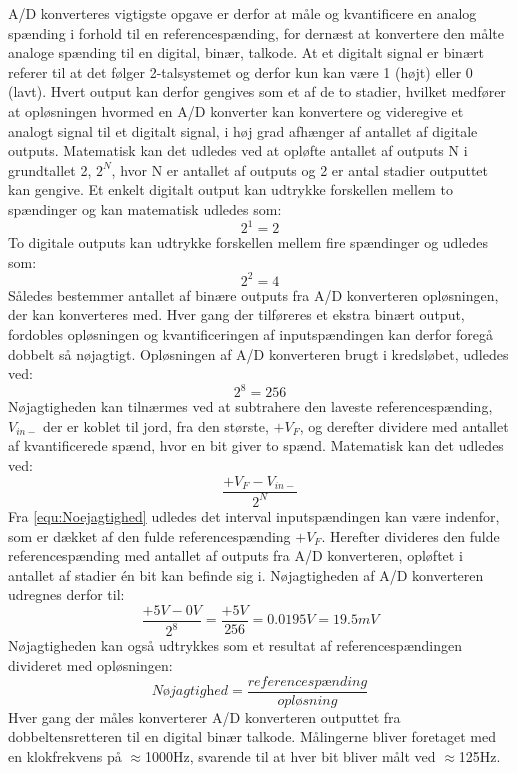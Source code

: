 A/D konverteres vigtigste opgave er derfor at måle og kvantificere en analog spænding i forhold til en referencespænding, for dernæst at konvertere den målte analoge spænding til en digital, binær, talkode. At et digitalt signal er binært referer til at det følger 2-talsystemet og derfor kun kan være 1 (højt) eller 0 (lavt). Hvert output kan derfor gengives som et af de to stadier, hvilket medfører at opløsningen hvormed en A/D konverter kan konvertere og videregive et analogt signal til et digitalt signal, i høj grad afhænger af antallet af digitale outputs. 
Matematisk kan det udledes ved at opløfte antallet af outputs N i grundtallet 2, $2^N$, hvor N er antallet af outputs og 2 er antal stadier outputtet kan gengive. Et enkelt digitalt output kan udtrykke forskellen mellem to spændinger og kan matematisk udledes som:
%
\begin{equation}
	2^1 = 2
\end{equation}
%
To digitale outputs kan udtrykke forskellen mellem fire spændinger og udledes som:
%
\begin{equation}
	2^2 = 4
\end{equation}  
%
Således bestemmer antallet af binære outputs fra A/D konverteren opløsningen, der kan konverteres med. Hver gang der tilføreres et ekstra binært output, fordobles opløsningen og kvantificeringen af inputspændingen kan derfor foregå dobbelt så nøjagtigt.
Opløsningen af A/D konverteren brugt i kredsløbet, udledes ved:
%
\begin{equation}
	2^8 = 256
\end{equation}
% 
Nøjagtigheden kan tilnærmes ved at subtrahere den laveste referencespænding, $V_{in-}$ der er koblet til jord, fra den største, $+V_F$, og derefter dividere med antallet af kvantificerede spænd, hvor en bit giver to spænd. Matematisk kan det udledes ved:
%
\begin{equation}
\frac{+V_{F}-V_{in-}}{2^N}
\label{equ:Noejagtighed}
\end{equation}
%
Fra \autoref{equ:Noejagtighed} udledes det interval inputspændingen kan være indenfor, som er dækket af den fulde referencespænding $+V_F$. Herefter divideres den fulde referencespænding med antallet af outputs fra A/D konverteren, opløftet i antallet af stadier én bit kan befinde sig i. Nøjagtigheden af A/D konverteren udregnes derfor til:
%
\begin{equation}
	\frac{+5V-0V}{2^8} = \frac{+5V}{256} = 0.0195V = 19.5mV
\end{equation}
%
Nøjagtigheden kan også udtrykkes som et resultat af referencespændingen divideret med opløsningen:
%
\begin{equation}
	\textit{Nøjagtighed} = \frac{\textit{referencespænding}}{\textit{opløsning}}
\end{equation}
%
Hver gang der måles konverterer A/D konverteren outputtet fra dobbeltensretteren til en digital binær talkode. Målingerne bliver foretaget med en klokfrekvens på $\approx$1000Hz, svarende til at hver bit bliver målt ved $\approx$125Hz.

